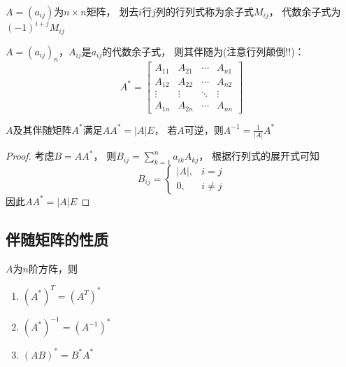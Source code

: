 ~

\begin{definition}[(代数)余子式]
  $A = (a_{ij})$为$n \times n$矩阵，
  划去$i$行$j$列的行列式称为余子式$M_{ij}$，
  代数余子式为$(-1)^{i+j}M_{ij}$
\end{definition}

\begin{definition}[伴随矩阵]
  $A = (a_{ij})_n$，$A_{ij}$是$a_{ij}$的代数余子式，
  则其伴随为(注意行列颠倒!!)：
  \begin{equation*}
    A^{*} = \left[
      \begin{array}{cccc}
        A_{11}&A_{21}& \cdots& A_{n1} \\
        A_{12}&A_{22}&\cdots&A_{n2} \\
        \vdots&\vdots&\ddots&\vdots \\
        A_{1n}&A_{2n}&\cdots&A_{nn}
      \end{array}
    \right]
  \end{equation*}
\end{definition}

\begin{theorem}[利用伴随求逆]
  $A$及其伴随矩阵$A^{*}$满足$AA^{*} = |A|E$，
  若$A$可逆，则$A^{-1} = \frac{1}{|A|}A^{*}$
\end{theorem}

\begin{proof}
  考虑$B = AA^{\ast}$，
  则$B_{ij} = \sum\limits_{k = 1}^n a_{ik}A_{kj}$，
  根据行列式的展开式可知
  \begin{equation*}
    B_{ij} =
    \begin{cases}
      |A|, &i = j\\
      0, & i \neq j
    \end{cases}
  \end{equation*}
  因此$AA^{\ast} = |A|E$
\end{proof}

\subsection{伴随矩阵的性质}

\begin{theorem}[伴随运算的性质]
  $A$为$n$阶方阵，则
  \begin{enumerate}
  \item $(A^{\ast})^T = (A^T)^{\ast}$
  \item $(A^{\ast})^{-1} = (A^{-1})^{\ast}$
  \item $(AB)^{\ast} = B^{\ast}A^{\ast}$
  \end{enumerate}
\end{theorem}


